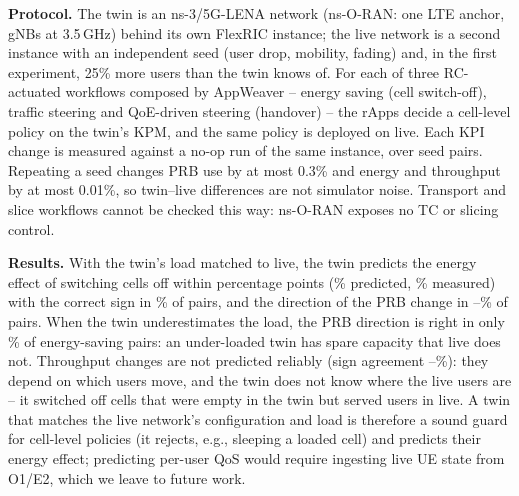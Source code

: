 \textbf{Protocol.} The twin is an ns-3/5G-LENA network (ns-O-RAN: one LTE anchor,
 gNBs at 3.5\,GHz) behind its own FlexRIC instance; the live network is a
second instance with an independent seed (user drop, mobility, fading) and, in the first experiment,
25\% more users than the twin knows of. For each of three RC-actuated workflows composed by AppWeaver
-- energy saving (cell switch-off), traffic steering and QoE-driven steering (handover) -- the rApps
decide a cell-level policy on the twin's KPM, and the same policy is deployed on live. Each KPI change
is measured against a no-op run of the same instance, over  seed pairs.
Repeating a seed changes PRB use by at most 0.3\% and energy and throughput by at most 0.01\%,
so twin--live differences are not simulator noise. Transport and slice workflows cannot be checked
this way: ns-O-RAN exposes no TC or slicing control.

\textbf{Results.} With the twin's load matched to live, the twin predicts the energy effect of switching
cells off within  percentage points
(\% predicted,
\% measured) with the correct sign in
\% of pairs, and the direction of the PRB change
in --\%
of pairs. When the twin underestimates the load, the PRB direction is right in only
\% of energy-saving pairs: an under-loaded twin has
spare capacity that live does not. Throughput changes are not predicted reliably (sign agreement
--\%):
they depend on which users move, and the twin does not know where the live users are -- it switched
off cells that were empty in the twin but served users in live. A twin that matches the live network's
configuration and load is therefore a sound guard for cell-level policies (it rejects, e.g., sleeping a
loaded cell) and predicts their energy effect; predicting per-user QoS would require ingesting live UE
state from O1/E2, which we leave to future work.
